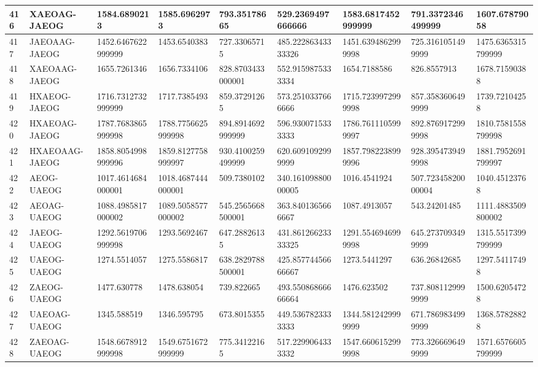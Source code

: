 {\begin{longtable}{|l|l|l|l|l|l|l|l|l|}
        416 & XAEOAG-JAEOG & 1584.6890213 & 1585.6962973 & 793.35178665 & 529.2369497666666 & 1583.6817452999999 & 791.3372346499999 & 1607.67879058 \\ \hline
        417 & JAEOAAG-JAEOG & 1452.6467622999999 & 1453.6540383 & 727.33065715 & 485.22286343333326 & 1451.6394862999998 & 725.3161051499999 & 1475.6365315799999 \\ \hline
        418 & XAEOAAG-JAEOG & 1655.7261346 & 1656.7334106 & 828.8703433000001 & 552.9159875333334 & 1654.7188586 & 826.8557913 & 1678.71590388 \\ \hline
        419 & HXAEOG-JAEOG & 1716.7312732999999 & 1717.7385493 & 859.37291265 & 573.2510337666666 & 1715.7239972999998 & 857.3583606499999 & 1739.72104258 \\ \hline
        420 & HXAEOAG-JAEOG & 1787.7683865999998 & 1788.7756625999998 & 894.8914692999999 & 596.9300715333333 & 1786.7611105999997 & 892.8769172999998 & 1810.7581558799998 \\ \hline
        421 & HXAEOAAG-JAEOG & 1858.8054998999996 & 1859.8127758999997 & 930.4100259499999 & 620.6091092999999 & 1857.7982238999996 & 928.3954739499998 & 1881.7952691799997 \\ \hline
        422 & AEOG-UAEOG & 1017.4614684000001 & 1018.4687444000001 & 509.7380102 & 340.16109880000005 & 1016.4541924 & 507.72345820000004 & 1040.45123768 \\ \hline
        423 & AEOAG-UAEOG & 1088.4985817000002 & 1089.5058577000002 & 545.2565668500001 & 363.8401365666667 & 1087.4913057 & 543.24201485 & 1111.4883509800002 \\ \hline
        424 & JAEOG-UAEOG & 1292.5619706999998 & 1293.5692467 & 647.28826135 & 431.86126623333325 & 1291.5546946999998 & 645.2737093499999 & 1315.5517399799999 \\ \hline
        425 & UAEOG-UAEOG & 1274.5514057 & 1275.5586817 & 638.2829788500001 & 425.85774456666667 & 1273.5441297 & 636.26842685 & 1297.54117498 \\ \hline
        426 & ZAEOG-UAEOG & 1477.630778 & 1478.638054 & 739.822665 & 493.55086866666664 & 1476.623502 & 737.8081129999999 & 1500.62054728 \\ \hline
        427 & UAEOAG-UAEOG & 1345.588519 & 1346.595795 & 673.8015355 & 449.5367823333333 & 1344.5812429999999 & 671.7869834999999 & 1368.57828828 \\ \hline
        428 & ZAEOAG-UAEOG & 1548.6678912999998 & 1549.6751672999999 & 775.34122165 & 517.2299064333332 & 1547.6606152999998 & 773.3266696499999 & 1571.6576605799999 \\ \hline

\end{longtable}}
